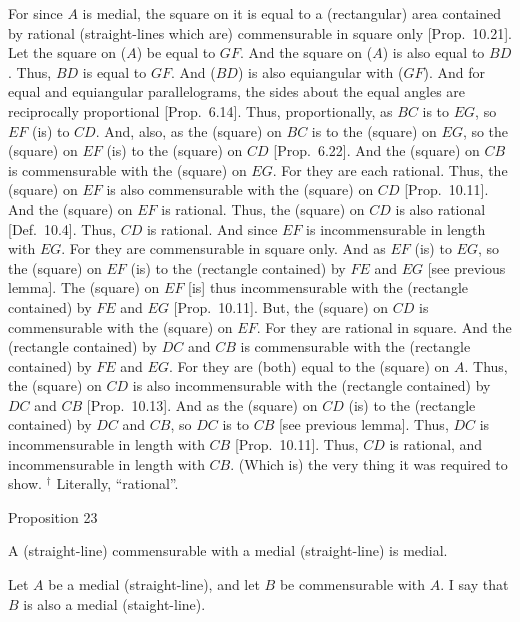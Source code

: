 For since $A$ is medial, the square on it is equal to a (rectangular) area
contained by rational (straight-lines which are) commensurable in square
only [Prop.~10.21]. Let the square on ($A$) be equal
to $GF$. And the square on ($A$) is also equal to $BD$. Thus, $BD$
is equal to $GF$. And ($BD$) is also equiangular with ($GF$). And for equal and
equiangular parallelograms, the sides about the equal angles are
reciprocally proportional [Prop.~6.14]. 
Thus, proportionally,  as $BC$ is to $EG$, so $EF$ (is) to $CD$.
And, also, as the (square) on $BC$ is to the (square) on $EG$, so
the (square) on $EF$ (is) to the (square) on $CD$ [Prop.~6.22]. 
And the (square) on $CB$ is commensurable with the (square) on $EG$.
For they are each rational. Thus, the (square) on $EF$ is also commensurable
with the (square) on $CD$ [Prop.~10.11]. And
the (square) on $EF$ is rational. Thus, the (square) on $CD$ is also rational
[Def.~10.4]. Thus, $CD$ is rational.
And since $EF$ is incommensurable in length with
$EG$. For they are commensurable in square only. And as $EF$ (is) to $EG$,
so the (square) on $EF$ (is) to the (rectangle contained) by $FE$ and $EG$ 
[see previous lemma]. The (square) on $EF$ [is] thus incommensurable with the (rectangle contained) by $FE$ and $EG$ [Prop.~10.11]. But, the (square) on $CD$
is commensurable with the (square) on $EF$. For they are rational
in square.
And the (rectangle contained) by $DC$ and $CB$ is commensurable
with the (rectangle contained) by $FE$ and $EG$. For they are (both)
equal to the (square) on $A$. Thus, the (square) on $CD$ is also
incommensurable with the (rectangle contained) by $DC$ and $CB$
[Prop.~10.13]. And as the (square) on $CD$
(is) to the (rectangle contained) by $DC$ and $CB$, so $DC$ is to $CB$ [see
previous lemma]. Thus, $DC$ is incommensurable in length with $CB$
[Prop.~10.11]. Thus, $CD$ is rational, and
incommensurable in length with $CB$. (Which is) the very thing it was required to show.
{\footnotesize\noindent$^\dag$  Literally, ``rational''.}


\begin{center}
{\large Proposition 23}
\end{center}

A (straight-line) commensurable with
a medial (straight-line) is medial.

Let $A$ be a medial (straight-line), and let $B$ be commensurable with $A$.
I say that $B$ is also a medial (staight-line).

